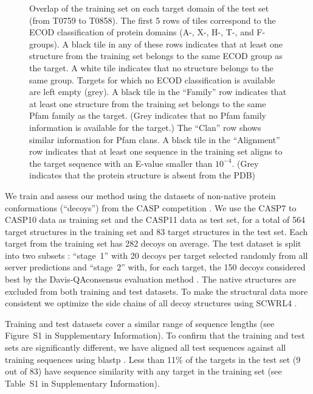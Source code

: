\documentclass{bioinfo}
\begin{document}
\begin{figure}[t]
    \vspace{-15pt}
    \caption{Overlap of the training set on each target domain of the
    test set (from T0759 to T0858). The first 5 rows of tiles
    correspond to the ECOD classification of protein domains (A-, X-,
    H-, T-, and F-groups). A black tile in any of these rows indicates
    that at least one structure from the training set belongs to the
    same ECOD group as the target. A white tile indicates that no
    structure belongs to the same group. Targets for which no ECOD
    classification is available are left empty (grey).
    A black tile in the ``Family'' row indicates that at least one
    structure from the training set belongs to the same Pfam family as
    the target. (Grey indicates that no Pfam family information is
    available for the target.) The ``Clan'' row shows similar
    information for Pfam clans. A black tile in the ``Alignment'' row
    indicates that at least one sequence in the training set aligns to
    the target sequence with an E-value smaller than $10^{-4}$. (Grey
    indicates that the protein structure is absent from the PDB)}
    \label{Fig:summaryTable}
\end{figure}

We train and assess our method using the datasets of non-native protein
conformations (``decoys'') from
the CASP competition \citep{moult2014critical}.  We use the CASP7 to
CASP10 data as training set and the CASP11 data as test set, for a
total of 564 target structures in the training set and 83 target
structures in the test set. Each target from the training set has 282
decoys on average.
The test dataset is split into two subsets \citep{kryshtafovych2015}:
``stage~1'' with 20 decoys per target selected randomly from all
server predictions and ``stage~2'' with, for each target, the 150 decoys
considered best by the Davis-QAconsensus evaluation
method \citep{kryshtafovych2015}.
The native structures are excluded from both training 
and test datasets. To make the
structural data more consistent we optimize the side chains of all decoy
structures using SCWRL4 \citep{krivov2009improved}.

Training and test datasets cover a similar range of sequence
lengths (see Figure~S1 in Supplementary Information). To confirm that the
training and test sets are significantly different, we have aligned
all test sequences against all training sequences using
blastp \citep{altschul1990basic}.  Less than 11\% of the targets in the
test set (9 out of 83) have sequence similarity with any target in the
training set (see Table~S1 in Supplementary Information).
\end{document}
